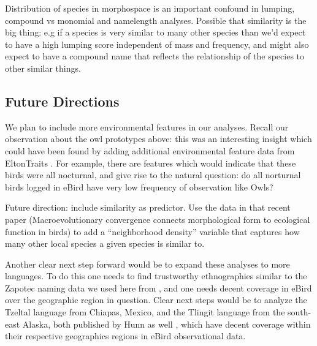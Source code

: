 \documentclass[10pt,letterpaper]{article}
\begin{document}
Distribution of species in morphospace is an important confound in lumping, compound vs monomial and namelength analyses. Possible that similarity is the big thing: e.g if a species is very similar to many other species than we’d expect to have a high lumping score independent of mass and frequency, and might also expect to have a compound name that reflects the relationship of the species to other similar things.


\subsection{Future Directions}

We plan to include more environmental features in our analyses. Recall our observation about the owl prototypes above: this was an interesting insight which could have been found by adding additional environmental feature data from EltonTraits \cite{wilman2014eltontraits}. For example, there are features which would indicate that these birds were all nocturnal, and give rise to the natural question: do all norturnal birds logged in eBird have very low frequency of observation like Owls?

Future direction: include similarity as predictor. Use the data in that recent paper (Macroevolutionary convergence connects morphological form to ecological function in birds) \cite{pigot2020macroevolutionary} to add a “neighborhood density” variable that captures how many other local species a given species is similar to.


Another clear next step forward would be to expand these analyses to more languages. To do this one needs to find trustworthy ethnographies similar to the Zapotec naming data we used here from , and one needs decent coverage in eBird over the geographic region in question. Clear next steps would be to analyze the Tzeltal language from Chiapas, Mexico, and the Tlingit language from the south-east Alaska, both published by Hunn as well \cite{hunn1977tzeltal,hunn2012tlingit}, which have decent coverage within their respective geographics regions in eBird observational data. 
\end{document}
